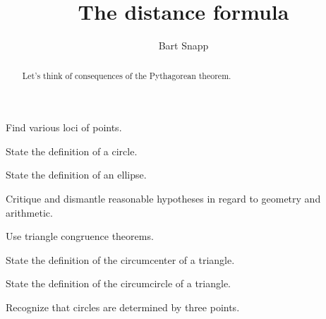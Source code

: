 \documentclass[nooutcomes,noauthor,handout]{ximera}
\title{The distance formula}
\author{Bart Snapp}
\begin{document}
\begin{abstract}
  Let's think of consequences of the Pythagorean theorem.
\end{abstract}
\maketitle


\begin{listOutcomes}
\item Find various loci of points.
\item State the definition of a circle.
\item State the definition of an ellipse.
\item{Critique and dismantle reasonable hypotheses in regard to geometry and arithmetic.}
\item Use triangle congruence theorems.
\item State the definition of the circumcenter of a triangle.
\item State the definition of the circumcircle of a triangle.
\item Recognize that circles are determined by three points.
\end{listOutcomes}


\mynewpage
\end{document}
